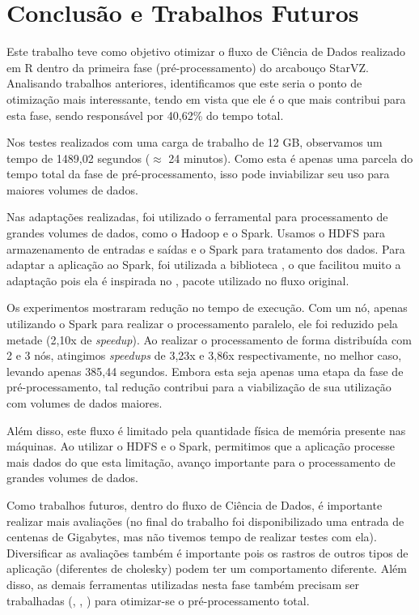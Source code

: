 \chapter{Conclusão e Trabalhos Futuros} \label{ch:conclusion}

Este trabalho teve como objetivo otimizar o fluxo de Ciência de Dados realizado 
em R dentro da primeira fase (pré-processamento) do arcabouço StarVZ. 
Analisando trabalhos anteriores, identificamos que este seria o ponto de 
otimização mais interessante, tendo em vista que ele é o que mais contribui 
para esta fase, sendo responsável por 40,62\% do tempo total.

Nos testes realizados com uma carga de trabalho de 12 GB, observamos um tempo 
de 1489,02 segundos ($\approx$ 24 minutos). Como esta é apenas uma parcela do 
tempo total da fase de pré-processamento, isso pode inviabilizar seu uso para 
maiores volumes de dados.

Nas adaptações realizadas, foi utilizado o ferramental para processamento de 
grandes volumes de dados, como o Hadoop e o Spark. Usamos o HDFS para 
armazenamento de entradas e saídas e o Spark para tratamento dos dados. Para 
adaptar a aplicação ao Spark, foi utilizada a biblioteca , o 
que facilitou muito a adaptação pois ela é inspirada no 
, pacote utilizado no fluxo original.

Os experimentos mostraram redução no tempo de execução. Com um nó, apenas 
utilizando o Spark para realizar o processamento paralelo, ele foi reduzido 
pela metade (2,10x de \emph{speedup}). Ao realizar o processamento de 
forma distribuída com 2 e 3 nós, atingimos \emph{speedups} de 3,23x e 3,86x 
respectivamente, no melhor caso, levando apenas 385,44 segundos. Embora esta 
seja apenas uma etapa da fase de pré-processamento, tal redução contribui para 
a viabilização de sua utilização com volumes de dados maiores.

Além disso, este fluxo é limitado pela quantidade física de memória presente 
nas máquinas. Ao utilizar o HDFS e o Spark, permitimos que a aplicação processe 
mais dados do que esta limitação, avanço importante para o processamento de 
grandes volumes de dados.

Como trabalhos futuros, dentro do fluxo de Ciência de Dados, é importante 
realizar mais avaliações (no final do trabalho foi disponibilizado uma entrada 
de centenas de Gigabytes, mas não tivemos tempo de realizar testes com ela). 
Diversificar as avaliações também é importante pois os rastros de outros tipos 
de aplicação (diferentes de cholesky) podem ter um comportamento diferente. 
Além disso, as demais ferramentas utilizadas nesta fase também precisam ser 
trabalhadas (, , 
) para otimizar-se o pré-processamento total.